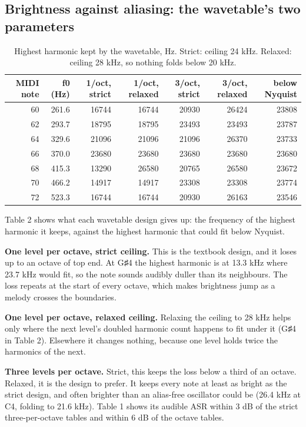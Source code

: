\documentclass[conference]{IEEEtran}
\begin{document}
\subsection{Brightness against aliasing: the wavetable's two parameters}
\begin{table}[t]
\centering\footnotesize
\caption{Highest harmonic kept by the wavetable, Hz. Strict: ceiling 24 kHz. Relaxed: ceiling 28 kHz, so nothing folds below 20 kHz.}
\begin{tabular}{@{}rrrrrrr@{}}
\toprule
\textbf{MIDI note} & \textbf{f0 (Hz)} & \textbf{1/oct, strict} & \textbf{1/oct, relaxed} & \textbf{3/oct, strict} & \textbf{3/oct, relaxed} & \textbf{below Nyquist} \\
\midrule
60 & 261.6 & 16744 & 16744 & 20930 & 26424 & 23808 \\
62 & 293.7 & 18795 & 18795 & 23493 & 23493 & 23787 \\
64 & 329.6 & 21096 & 21096 & 21096 & 26370 & 23733 \\
66 & 370.0 & 23680 & 23680 & 23680 & 23680 & 23680 \\
68 & 415.3 & 13290 & 26580 & 20765 & 26580 & 23672 \\
70 & 466.2 & 14917 & 14917 & 23308 & 23308 & 23774 \\
72 & 523.3 & 16744 & 16744 & 20930 & 26163 & 23546 \\
\bottomrule
\end{tabular}
\end{table}

Table 2 shows what each wavetable design gives up: the frequency of the highest harmonic it keeps, against the highest harmonic that could fit below Nyquist.

\textbf{One level per octave, strict ceiling.} This is the textbook design, and it loses up to an octave of top end. At G♯4 the highest harmonic is at 13.3 kHz where 23.7 kHz would fit, so the note sounds audibly duller than its neighbours. The loss repeats at the start of every octave, which makes brightness jump as a melody crosses the boundaries.

\textbf{One level per octave, relaxed ceiling.} Relaxing the ceiling to 28 kHz helps only where the next level's doubled harmonic count happens to fit under it (G♯4 in Table 2). Elsewhere it changes nothing, because one level holds twice the harmonics of the next.

\textbf{Three levels per octave.} Strict, this keeps the loss below a third of an octave. Relaxed, it is the design to prefer. It keeps every note at least as bright as the strict design, and often brighter than an alias-free oscillator could be (26.4 kHz at C4, folding to 21.6 kHz). Table 1 shows its audible ASR within 3 dB of the strict three-per-octave tables and within 6 dB of the octave tables.
\end{document}
